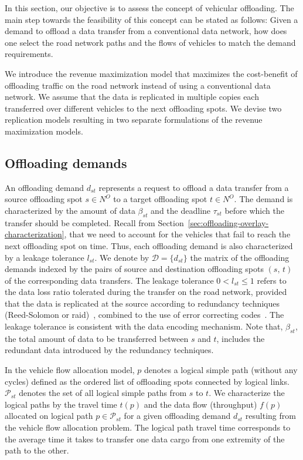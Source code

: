 In this section, our objective is to assess the concept of vehicular offloading. The main step towards the feasibility of this concept can be stated as follows: Given a demand to offload a data transfer from a conventional data network, how does one select the road network paths and the flows of vehicles to match the demand requirements. 

We introduce the revenue maximization model that maximizes the cost-benefit of offloading traffic on the road network instead of using a conventional data network. We assume that the data is replicated in multiple copies each transferred over different vehicles to the next offloading spots. We devise two replication models resulting in two separate formulations of the revenue maximization models. 

\subsection{Offloading demands}
\label{sec:offloading-demands-feasibility}

An offloading demand $d_{st}$ represents a request to offload a data transfer from a source offloading spot $s\in N^{O}$ to a target offloading spot $t\in N^{O}$. The demand is characterized by the amount of data $\beta_{st}$ and the deadline $\tau_{st}$ before which the transfer should be completed. Recall from Section~\ref{sec:offloading-overlay-characterization}, that we need to account for the vehicles that fail to reach the next offloading spot on time. Thus, each offloading demand is also characterized by a leakage tolerance $l_{st}$. We denote by $\mathcal{D}=\{d_{st}\}$ the matrix of the offloading demands indexed by the pairs of source and destination offloading spots $(s,\,t)$ of the corresponding data transfers. The leakage tolerance $0 < l_{st} \leq 1$ refers to the data loss ratio tolerated during the transfer on the road network, provided that the data is replicated at the source according to redundancy techniques (\eg Reed-Solomon or \acrshort{raid})~\cite{chen1994raid}, combined to the use of error correcting codes~\cite{macwilliams1977theory}. The leakage tolerance is consistent with the data encoding mechanism. Note that, $\beta_{st}$, the total amount of data to be transferred between $s$ and $t$, includes the redundant data introduced by the redundancy techniques. 

In the vehicle flow allocation model, $p$ denotes a logical simple path (\ie without any cycles) defined as the ordered list of offloading spots connected by logical links. $\mathcal{P}_{st}$ denotes the set of all logical simple paths from $s$ to $t$. We characterize the logical paths by the travel time $t(p)$ and the data flow (throughput) $f(p)$ allocated on logical path $p\in\mathcal{P}_{st}$ for a given offloading demand $d_{st}$ resulting from the vehicle flow allocation problem. The logical path travel time corresponds to the average time it takes to transfer one data cargo from one extremity of the path to the other. 


